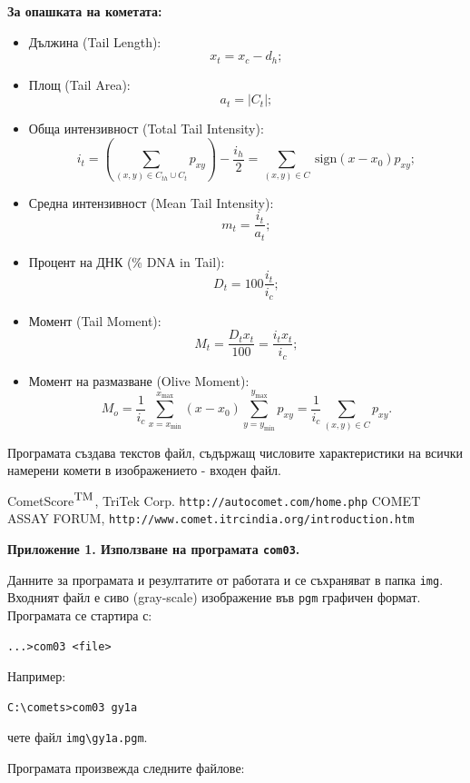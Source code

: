 \documentclass[12pt]{article}
\begin{document}
\textbf{За опашката на кометата:}
\begin{itemize}
\item
 Дължина (Tail Length):
$$
 x_t = x_c - d_h;
$$
\item
 Площ (Tail Area):
$$
 a_t = | C_t |;
$$
\item
 Обща интензивност (Total Tail Intensity):
$$
 i_t = \left(\sum_{(x, y)\in C_{th} \cup C_t} p_{xy}\right) - \frac{i_h}2
 = \sum_{(x, y)\in C}\ \textrm{sign}(x - x_0) p_{xy};
$$
\item
 Средна интензивност (Mean Tail Intensity):
$$
 m_t = \displaystyle\frac{i_t}{a_t};
$$
\item
 Процент на ДНК (\% DNA in Tail):
$$
 D_t = 100 \frac{i_t}{i_c};
$$
\item
 Момент (Tail Moment):
$$
 M_t = \frac{D_t x_t}{100} =  \frac{i_t x_t}{i_c};
$$
\item
 Момент на размазване (Olive Moment):
$$
 M_o = \frac1{i_c}\sum_{x = x_{\min}}^{x_{\max}} (x - x_0)
  \sum_{y = y_{\min}}^{y_{\max}} p_{xy} =
\frac1{i_c} \sum_{(x,y)\in C} p_{xy}.
$$
\end{itemize}

Програмата създава текстов файл, съдържащ числовите характеристики
на всички намерени комети в изображението - входен файл.


\begin{thebibliography}{qq}
 CometScore$^{\mbox{\small TM}}$, TriTek Corp.
 \verb|http://autocomet.com/home.php|
 COMET ASSAY FORUM,
 \verb|http://www.comet.itrcindia.org/introduction.htm|
\end{thebibliography}

\newpage
{\bf\large Приложение 1. Използване на програмата \verb|com03|.}

\medskip
Данните за програмата и резултатите от работата и се съхраняват в
папка \verb|img|. Вход\-ни\-ят файл е сиво (gray-scale) изображение
във \verb|pgm| графичен формат. Програмата се стартира с:
\begin{verbatim}
...>com03 <file>
\end{verbatim}

Например:
\begin{verbatim}
C:\comets>com03 gy1a
\end{verbatim}
чете файл \verb|img\gy1a.pgm|.

 Програмата произвежда следните файлове:
\end{document}
